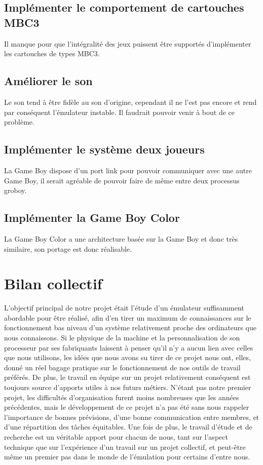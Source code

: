 \documentclass[french]{report}
\begin{document}
\subsection*{Implémenter le comportement de cartouches MBC3}
Il manque pour que l'intégralité des jeux puissent être supportés d'implémenter les cartouches de types MBC3.
\subsection*{Améliorer le son}
Le son tend à être fidèle au son d'origine, cependant il ne l'est pas encore et rend par conséquent l'émulateur instable. Il faudrait pouvoir venir à bout de ce problème.
\subsection*{Implémenter le système deux joueurs}
La Game Boy dispose d'un port link pour pouvoir communiquer avec une autre Game Boy, il serait agréable de pouvoir faire de même entre deux processus groboy.
\subsection*{Implémenter la Game Boy Color}
La Game Boy Color a une architecture basée sur la Game Boy et donc très similaire, son portage est donc réalisable. 
\section*{Bilan collectif}
L'objectif principal de notre projet était l'étude d'un émulateur suffisamment abordable pour être réalisé, afin d'en tirer un maximum de connaissances sur le fonctionnement bas niveau d'un système relativement proche des ordinateurs que nous connaissons.
Si le physique de la machine et la personnalisation de son processeur par ses fabriquants laissent à penser qu'il n'y a aucun lien avec celles que nous utilisons, les idées que nous avons su tirer de ce projet nous ont, elles, donné un réel bagage pratique sur le fonctionnement de nos outils de travail préférés. 
De plus, le travail en équipe sur un projet relativement conséquent est toujours source d'apports utiles à nos futurs métiers. N'étant pas notre premier projet, les difficultés d'organisation furent moins nombreuses que les années précédentes, mais le développement de ce projet n'a pas été sans nous rappeler l'importance de bonnes prévisions, d'une bonne communication entre membres, et d'une répartition des tâches équitables.
Une fois de plus, le travail d'étude et de recherche est un véritable apport pour chacun de nous, tant sur l'aspect technique que sur l'expérience d'un travail sur un projet collectif, et peut-être même un premier pas dans le monde de l'émulation pour certains d'entre nous.
\end{document}
